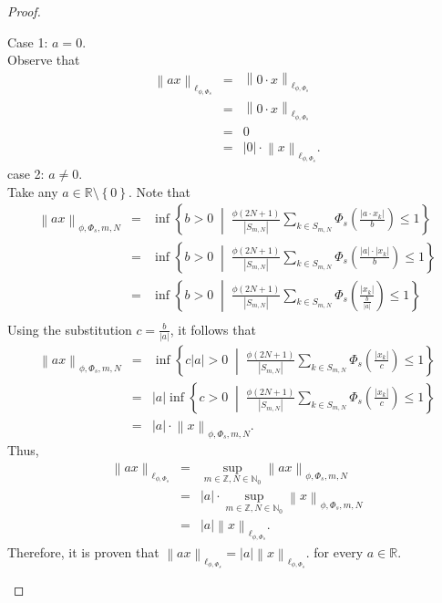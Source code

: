 \documentclass[12pt,a4paper]{article}
\theoremstyle{remark}
\begin{document}
\begin{proof}
\begin{enumerate}
        Case 1: $a = 0$.\\
        Observe that
        \begin{eqnarray*}
            \left\lVert ax \right\rVert _{\ell_{\phi,\Phi_s}}&=&\left\lVert 0\cdot x \right\rVert _{\ell_{\phi,\Phi_s}}\\
            &=&\left\lVert 0\cdot x \right\rVert _{\ell_{\phi,\Phi_s}}\\
            &=&0\\
            &=&\left|0\right|\cdot\left\lVert x \right\rVert _{\ell_{\phi,\Phi_s}}.
        \end{eqnarray*}
        case 2: $a \neq 0$.\\
        Take any $a \in \mathbb{R} \setminus \left\{0\right\}$. Note that
        \begin{eqnarray*}
            \left\lVert ax \right\rVert _{\phi, \Phi_s, m, N}&=&\inf \left\{b > 0 \;\middle|\; \frac{\phi\left(2N+1\right)}{\left|S_{m,N}\right|}\sum_{k\in S_{m,N}}\Phi_s\left(\frac{\left|a\cdot x_k\right|}{b}\right) \leq 1\right\}\\
            &=&\inf \left\{b > 0 \;\middle|\; \frac{\phi\left(2N+1\right)}{\left|S_{m,N}\right|}\sum_{k\in S_{m,N}}\Phi_s\left(\frac{\left|a\right|\cdot\left|x_k\right|}{b}\right) \leq 1\right\}\\
            &=&\inf \left\{b > 0 \;\middle|\; \frac{\phi\left(2N+1\right)}{\left|S_{m,N}\right|}\sum_{k\in S_{m,N}}\Phi_s\left(\frac{\left|x_k\right|}{\frac{b}{\left|a\right|}}\right) \leq 1\right\}\\
        \end{eqnarray*}
        Using the substitution $c = \frac{b}{\left|a\right|}$, it follows that
        \begin{eqnarray*}
            \left\lVert ax \right\rVert _{\phi, \Phi_s, m, N}&=&\inf \left\{c\left|a\right|> 0 \;\middle|\; \frac{\phi\left(2N+1\right)}{\left|S_{m,N}\right|}\sum_{k\in S_{m,N}}\Phi_s\left(\frac{\left|x_k\right|}{c}\right) \leq 1\right\}\\
            &=&\left|a\right|\inf \left\{c > 0 \;\middle|\; \frac{\phi\left(2N+1\right)}{\left|S_{m,N}\right|}\sum_{k\in S_{m,N}}\Phi_s\left(\frac{\left|x_k\right|}{c}\right) \leq 1\right\}\\
            &=&\left|a\right|\cdot\left\lVert x \right\rVert _{\phi, \Phi_s, m, N}.
        \end{eqnarray*}
        Thus,
        \begin{eqnarray*}
            \left\lVert ax \right\rVert _{\ell_{\phi,\Phi_s}}&=&\sup_{m \in \mathbb{Z}, N \in \mathbb{N}_0} \left\lVert a x\right\rVert_{\phi, \Phi_s, m, N}\\
            &=& \left|a\right|\cdot\sup_{m \in \mathbb{Z}, N \in \mathbb{N}_0} \left\lVert x\right\lVert_{\phi, \Phi_s, m, N}\\ 
            &=& \left| a\right| \left\lVert x\right\lVert_{\ell_{\phi, \Phi_s}}.
        \end{eqnarray*}
        Therefore, it is proven that $\left\lVert ax \right\rVert _{\ell_{\phi,\Phi_s}}=\left| a\right| \left\lVert x\right\lVert_{\ell_{\phi, \Phi_s}}$. for every $a\in \mathbb{R}$.
        

\end{enumerate}
\end{proof}
\end{document}
